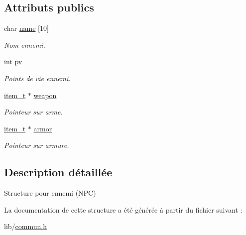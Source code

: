 \subsection*{Attributs publics}
\begin{DoxyCompactItemize}
\item 
\mbox{\label{structnpc__t_ab8e1412fa533563ca0170e7725ed8347}} 
char \hyperlink{structnpc__t_ab8e1412fa533563ca0170e7725ed8347}{name} \mbox{[}10\mbox{]}
\begin{DoxyCompactList}\small\item\em Nom ennemi. \end{DoxyCompactList}\item 
\mbox{\label{structnpc__t_a2549f17173dad6ee4ec5688daaeaa134}} 
int \hyperlink{structnpc__t_a2549f17173dad6ee4ec5688daaeaa134}{pv}
\begin{DoxyCompactList}\small\item\em Points de vie ennemi. \end{DoxyCompactList}\item 
\mbox{\label{structnpc__t_a66c0ac03e14a66c14c9354d7db9d0200}} 
\hyperlink{structitem__t}{item\+\_\+t} $\ast$ \hyperlink{structnpc__t_a66c0ac03e14a66c14c9354d7db9d0200}{weapon}
\begin{DoxyCompactList}\small\item\em Pointeur sur arme. \end{DoxyCompactList}\item 
\mbox{\label{structnpc__t_a67b8c0633ae50e39cd9291eb6bb79376}} 
\hyperlink{structitem__t}{item\+\_\+t} $\ast$ \hyperlink{structnpc__t_a67b8c0633ae50e39cd9291eb6bb79376}{armor}
\begin{DoxyCompactList}\small\item\em Pointeur sur armure. \end{DoxyCompactList}\end{DoxyCompactItemize}


\subsection{Description détaillée}
Structure pour ennemi (N\+PC) 

La documentation de cette structure a été générée à partir du fichier suivant \+:\begin{DoxyCompactItemize}
\item 
lib/\hyperlink{commun_8h}{commun.\+h}\end{DoxyCompactItemize}
